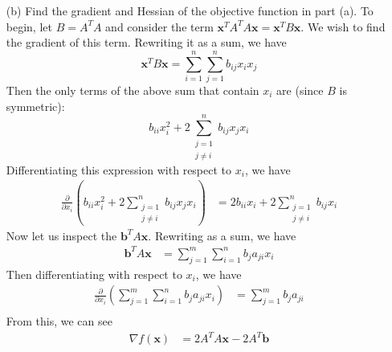 \documentclass{article}
\begin{document}
\begin{itemize}
\begin{itemize}
        \item[(b)] Find the gradient and Hessian of the objective function in part (a). 
        \newline\newline
        To begin, let $B = A^TA$ and consider the term $\mathbf{x}^TA^TA\mathbf{x} = \mathbf{x}^TB\mathbf{x}$. We wish to find the gradient of this term. Rewriting it as a sum, we have
        \[\mathbf{x}^TB\mathbf{x} = \sum_{i=1}^n\sum_{j = 1}^nb_{ij}x_ix_j\]
        Then the only terms of the above sum that contain $x_i$ are (since $B$ is symmetric):
        \[b_{ii}x_i^2 + 2\sum_{\substack{j=1\\j\neq i}}^nb_{ij}x_jx_i\]
        Differentiating this expression with respect to $x_i$, we have
        \begin{align*}
            \frac{\partial}{\partial x_i} \left(b_{ii}x_i^2 + 2\sum_{\substack{j=1\\j\neq i}}^nb_{ij}x_jx_i\right) &= 2b_{ii}x_i + 2\sum_{\substack{j=1\\j\neq i}}^n b_{ij}x_i
        \end{align*}
        Now let us inspect the $\mathbf{b}^TA\mathbf{x}$. Rewriting as a sum, we have 
        \begin{align*}
            \mathbf{b}^TA\mathbf{x} &= \sum_{j=1}^m\sum_{i=1}^nb_ja_{ji}x_i
        \end{align*}
        Then differentiating with respect to $x_i$, we have
        \begin{align*}
            \frac{\partial}{\partial x_i}\left(\sum_{j=1}^m\sum_{i=1}^nb_ja_{ji}x_i\right) &= \sum_{j=1}^mb_ja_{ji} \\
        \end{align*}
        From this, we can see
        \begin{align*}
            \nabla f(\mathbf{x}) &= 2A^TA\mathbf{x} - 2A^T\mathbf{b}\\
        \end{align*}
        


\end{itemize}
\end{itemize}
\end{document}
